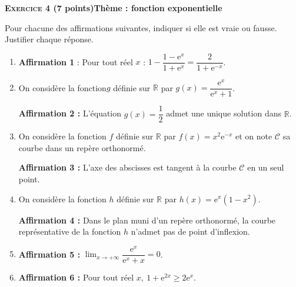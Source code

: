 \documentclass[10pt]{article}
\newcommand{\R}{\mathbb{R}}
\begin{document}
\bigskip

\textbf{\textsc{Exercice 4} \quad (7 points)\hfill Thème : fonction exponentielle}

\medskip

Pour chacune des affirmations suivantes, indiquer si elle est vraie ou fausse. Justifier chaque réponse.

\medskip

\begin{enumerate}
\item \textbf{Affirmation 1} : Pour tout réel $x$  : $1 - \dfrac{1 - \text{e}^x}{1 + \text{e}^x} = \dfrac{2}{1 + \text{e}^{-x}}$.
\item On considère la fonction$g$ définie sur $\R$ par $g(x) = \dfrac{\text{e}^x}{\text{e}^x + 1}$.

\textbf{Affirmation 2 : } L'équation $g(x) = \dfrac12$ admet une unique solution dans $\R$.
\item On considère la fonction $f$ définie sur $\R$ par $f(x) = x^2\text{e}^{-x}$ et on note 
$\mathcal{C}$ sa courbe dans un repère orthonormé.

\textbf{Affirmation 3 : } L'axe des abscisses est tangent à la courbe $\mathcal{C}$ en un seul point.
\item On considère la fonction $h$ définie sur $\R$ par $h(x) = \text{e}^x\left(1 -  x^2\right)$.

\textbf{Affirmation 4 :} Dans le plan muni d'un repère orthonormé, la courbe représentative de la fonction $h$ n'admet pas de point d'inflexion.

\item \textbf{Affirmation 5 :} $\displaystyle\lim_{x \to + \infty} \dfrac{\text{e}^x}{\text{e}^x + x} = 0$.

\item \textbf{Affirmation 6 :} Pour tout réel $x,\: 1 + \text{e}^{2x} \geqslant 2\text{e}^x$.
\end{enumerate}
\end{document}
